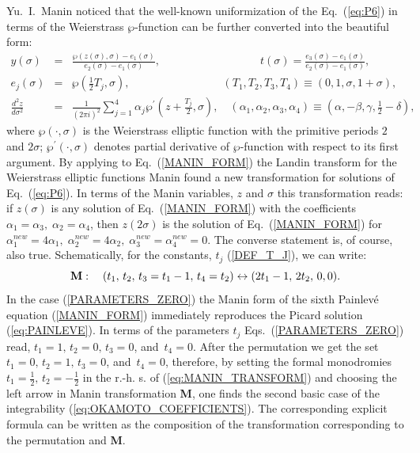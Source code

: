\documentclass[11pt]{article}
\begin{document}
\begin{appendix}
Yu.~I.~Manin \cite{M} noticed that the well-known uniformization of the
Eq.~(\ref{eq:P6}) in terms of the Weierstrass $\wp$-function can be
further converted into the beautiful form:
\begin{eqnarray}
  \label{MANIN_FORM}
y(\sigma)\!\!\!&=&\!\!\!\frac{\wp(z(\sigma),\sigma)-e_1(\sigma)}{e_2(\sigma)-e_1(\sigma)
},
\phantom{hhhhhhhhhhhhhhhi}
t(\sigma)=\frac{e_3(\sigma)-e_1(\sigma)}{e_2(\sigma)-e_1(\sigma)},\nonumber\\
e_j(\sigma)\!\!\!&=&\!\!\!\wp(\frac 12T_j,\sigma),\;\phantom{hhhhhhhhhhhhhh}
(T_1,T_2,T_3,T_4)\equiv(0,1,\sigma,1+\sigma),\nonumber\\
\frac{d^2z}{d\sigma^2}\!\!\!&=&\!\!\!\frac 1{(2\pi i)^2}
\sum\limits_{j=1}^4\alpha_j\wp^{\prime}(z+\frac{T_j}2,\sigma),\quad
(\alpha_1,\alpha_2,\alpha_3,\alpha_4)
\equiv(\alpha,-\beta,\gamma,\frac 12-\delta),
\end{eqnarray}
where $\wp(\cdot,\sigma)$ is the Weierstrass elliptic function with the
primitive periods $2$ and $2\sigma$;
$\wp^{'}(\cdot,\sigma)$ denotes partial derivative of $\wp$-function with respect to its first argument.
By applying to 
Eq.~(\ref{MANIN_FORM}) the Landin transform for the Weierstrass elliptic 
functions Manin found a new transformation for solutions of
Eq.~(\ref{eq:P6}). In terms of the Manin variables, $z$ and $\sigma$ this 
transformation reads: 
if $z(\sigma)$ is any solution of Eq.~(\ref{MANIN_FORM}) with the
coefficients
$\alpha_1=\alpha_3,\;\alpha_2=\alpha_4$, then $z(2\sigma)$ is the solution of
Eq.~(\ref{MANIN_FORM}) for $\alpha_1^{new}=4\alpha_1,\;
\alpha_2^{new}=4\alpha_2,\;\alpha_3^{new}=\alpha_4^{new}=0$. 
The converse statement is, of course, also true. Schematically,
for the constants, $t_j$ (\ref{DEF_T_J}), we can write: 
\begin{equation}
  \label{eq:MANIN_TRANSFORM}
  {\bf M}:\quad(t_1,\,t_2,\,t_3=t_1-1,\,t_4=t_2)
\leftrightarrow(2t_1-1,\,2t_2,\,0,0).
\end{equation}
In the case (\ref{PARAMETERS_ZERO}) the Manin form of the sixth Painlev\'e 
equation (\ref{MANIN_FORM}) immediately reproduces the Picard solution
(\ref{eq:PAINLEVE}).
In terms of the parameters $t_j$ Eqs.~(\ref{PARAMETERS_ZERO}) read,
$t_1=1,\,t_2=0,\,t_3=0$, and $\,t_4=0$. After the permutation we get
the set $t_1=0,\,t_2=1,\,t_3=0$, and $\,t_4=0$, therefore,
by setting the formal monodromies $t_1=\frac 12,\,t_2=-\frac 12$ 
in the r.-h. s. of (\ref{eq:MANIN_TRANSFORM}) and
choosing the left arrow in Manin transformation {\bf M},
one finds the second basic case of the integrability 
(\ref{eq:OKAMOTO_COEFFICIENTS}). The corresponding explicit formula
can be written as the composition of the transformation
corresponding to the permutation \cite{O} and {\bf M}.

\end{appendix}
\end{document}

